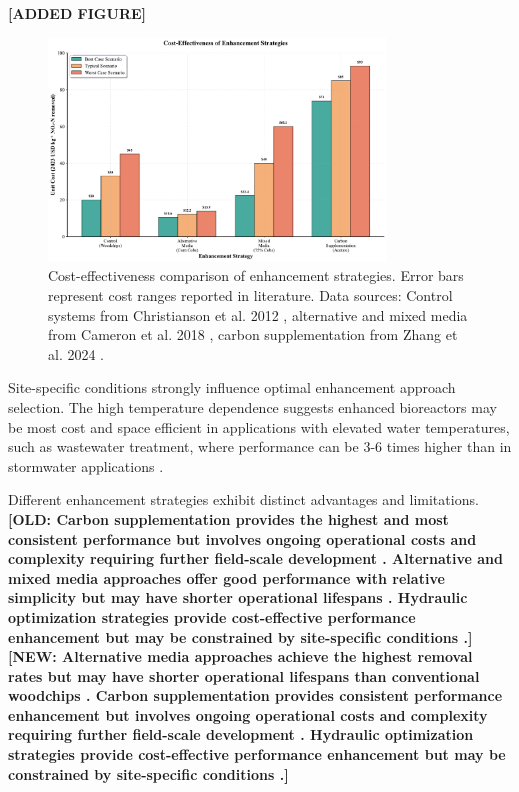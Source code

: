 \documentclass[12pt,a4paper]{article}
\newcommand{\replaced}[2]{\textcolor{deletedtext}{\textbf{[OLD: #1]}} \textcolor{replacedtext}{\textbf{[NEW: #2]}}}
\begin{document}
\textcolor{addedtext}{\textbf{[ADDED FIGURE]}}
\begin{figure}[H]
\centering
\includegraphics[width=0.8\textwidth]{fig5_cost_analysis}
\caption{Cost-effectiveness comparison of enhancement strategies. Error bars represent cost ranges reported in literature. Data sources: Control systems from Christianson et al. 2012 \citep{RN289}, alternative and mixed media from Cameron et al. 2018 \citep{RN350}, carbon supplementation from Zhang et al. 2024 \citep{RN196}.}
\label{fig:cost_analysis}
\end{figure}

Site-specific conditions strongly influence optimal enhancement approach selection. The high temperature dependence suggests enhanced bioreactors may be most cost and space efficient in applications with elevated water temperatures, such as wastewater treatment, where performance can be 3-6 times higher than in stormwater applications \citep{RN258, RN315}.

Different enhancement strategies exhibit distinct advantages and limitations. \replaced{Carbon supplementation provides the highest and most consistent performance but involves ongoing operational costs and complexity requiring further field-scale development \citep{RN632, RN196}. Alternative and mixed media approaches offer good performance with relative simplicity but may have shorter operational lifespans \citep{RN350, RN624}. Hydraulic optimization strategies provide cost-effective performance enhancement but may be constrained by site-specific conditions \citep{RN309}.}{Alternative media approaches achieve the highest removal rates but may have shorter operational lifespans than conventional woodchips \citep{RN350, RN624}. Carbon supplementation provides consistent performance enhancement but involves ongoing operational costs and complexity requiring further field-scale development \citep{RN632, RN196}. Hydraulic optimization strategies provide cost-effective performance enhancement but may be constrained by site-specific conditions \citep{RN309}.}
\end{document}
